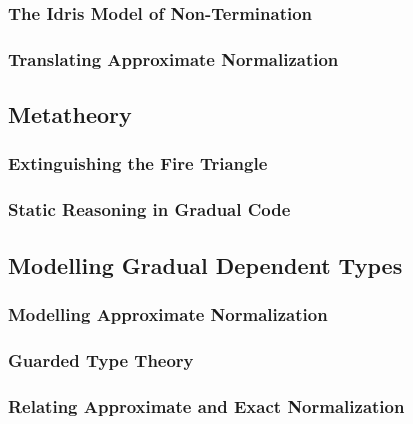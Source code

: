 \subsubsection{The Idris Model of Non-Termination}

\subsubsection{Translating Approximate Normalization}


\subsection{Metatheory}

\subsubsection{Extinguishing the Fire Triangle}

\subsubsection{Static Reasoning in Gradual Code}

\subsection{Modelling Gradual Dependent Types}


\subsubsection{Modelling Approximate Normalization}

\subsubsection{Guarded Type Theory}

\subsubsection{Relating Approximate and Exact Normalization}
